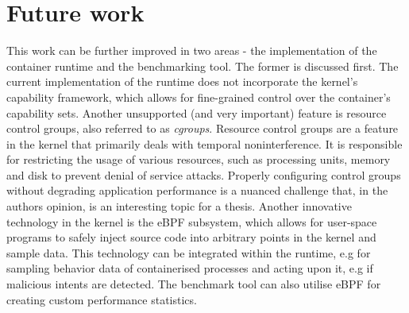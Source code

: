 \section{Future work}
This work can be further improved in two areas - the implementation of the container runtime 
and the benchmarking tool. The former is discussed first. 
The current implementation of the runtime does not incorporate the kernel's capability
framework, which allows for fine-grained control over the container's capability sets.
Another unsupported (and very important) feature
is resource control groups, also referred to as \textit{cgroups}. Resource control groups 
are a feature in the kernel that primarily deals with temporal noninterference. It is responsible 
for restricting the usage of various resources, such as processing units, memory and disk
to prevent denial of service attacks. Properly configuring control groups without degrading
application performance is a nuanced challenge that, in the 
authors opinion, is an interesting topic for a thesis.
Another innovative technology in the kernel is the eBPF subsystem, which allows 
for user-space programs to safely inject source code into arbitrary points in the kernel
and sample data. This technology can be integrated within the runtime, e.g for sampling 
behavior data of containerised processes and acting upon it, e.g if malicious intents are detected. 
The benchmark tool can also utilise eBPF for creating custom performance statistics.